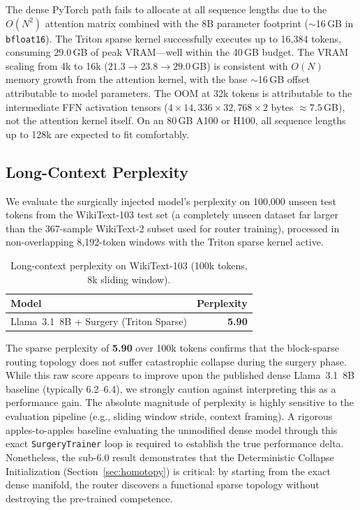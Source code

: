 \documentclass[11pt,a4paper]{article}
\begin{document}
The dense PyTorch path fails to allocate at all sequence lengths due to the $O(N^2)$ attention matrix combined with the 8B parameter footprint ($\sim$16\,GB in \texttt{bfloat16}). The Triton sparse kernel successfully executes up to 16{,}384 tokens, consuming 29.0\,GB of peak VRAM---well within the 40\,GB budget. The VRAM scaling from 4k to 16k ($21.3 \to 23.8 \to 29.0$\,GB) is consistent with $O(N)$ memory growth from the attention kernel, with the base $\sim$16\,GB offset attributable to model parameters. The OOM at 32k tokens is attributable to the intermediate FFN activation tensors ($4 \times 14{,}336 \times 32{,}768 \times 2$ bytes $\approx 7.5$\,GB), not the attention kernel itself. On an 80\,GB A100 or H100, all sequence lengths up to 128k are expected to fit comfortably.

\subsection{Long-Context Perplexity}

We evaluate the surgically injected model's perplexity on 100,000 unseen test tokens from the WikiText-103 test set \citep{merity2016pointer} (a completely unseen dataset far larger than the 367-sample WikiText-2 subset used for router training), processed in non-overlapping 8,192-token windows with the Triton sparse kernel active.

\begin{table}[h]
\centering
\caption{Long-context perplexity on WikiText-103 (100k tokens, 8k sliding window).}
\label{tab:perplexity}
\begin{tabular}{@{}lr@{}}
\toprule
Model & Perplexity \\
\midrule
Llama~3.1~8B + Surgery (Triton Sparse) & \textbf{5.90} \\
\bottomrule
\end{tabular}
\end{table}

The sparse perplexity of \textbf{5.90} over 100k tokens confirms that the block-sparse routing topology does not suffer catastrophic collapse during the surgery phase. While this raw score appears to improve upon the published dense Llama~3.1~8B baseline (typically 6.2--6.4), we strongly caution against interpreting this as a performance gain. The absolute magnitude of perplexity is highly sensitive to the evaluation pipeline (e.g., sliding window stride, context framing). A rigorous apples-to-apples baseline evaluating the unmodified dense model through this exact \texttt{SurgeryTrainer} loop is required to establish the true performance delta. Nonetheless, the sub-6.0 result demonstrates that the Deterministic Collapse Initialization (Section~\ref{sec:homotopy}) is critical: by starting from the exact dense manifold, the router discovers a functional sparse topology without destroying the pre-trained competence.
\end{document}
